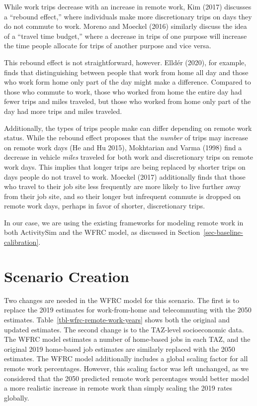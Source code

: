 \documentclass[fancy, twoside, mastersfancy, ms]{byuthesis}
\begin{document}
While work trips decrease with an increase in remote work, Kim (2017)
discusses a ``rebound effect,'' where individuals make more
discretionary trips on days they do not commute to work. Moreno and
Moeckel (2016) similarly discuss the idea of a ``travel time budget,''
where a decrease in trips of one purpose will increase the time people
allocate for trips of another purpose and vice versa.

This rebound effect is not straightforward, however. Elldér (2020), for
example, finds that distinguishing between people that work from home
all day and those who work form home only part of the day might make a
difference. Compared to those who commute to work, those who worked from
home the entire day had fewer trips and miles traveled, but those who
worked from home only part of the day had more trips and miles traveled.

Additionally, the types of trips people make can differ depending on
remote work status. While the rebound effect proposes that the
\emph{number} of trips may increase on remote work days (He and Hu
2015), Mokhtarian and Varma (1998) find a decrease in vehicle
\emph{miles} traveled for both work and discretionary trips on remote
work days. This implies that longer trips are being replaced by shorter
trips on days people do not travel to work. Moeckel (2017) additionally
finds that those who travel to their job site less frequently are more
likely to live further away from their job site, and so their longer but
infrequent commute is dropped on remote work days, perhaps in favor of
shorter, discretionary trips.

In our case, we are using the existing frameworks for modeling remote
work in both ActivitySim and the WFRC model, as discussed in
Section~\ref{sec-baseline-calibration}.

\section{Scenario Creation}\label{scenario-creation-2}

Two changes are needed in the WFRC model for this scenario. The first is
to replace the 2019 estimates for work-from-home and telecommuting with
the 2050 estimates. Table~\ref{tbl-wfrc-remote-work-years} shows both
the original and updated estimates. The second change is to the
TAZ-level socioeconomic data. The WFRC model estimates a number of
home-based jobs in each TAZ, and the original 2019 home-based job
estimates are similarly replaced with the 2050 estimates. The WFRC model
additionally includes a global scaling factor for all remote work
percentages. However, this scaling factor was left unchanged, as we
considered that the 2050 predicted remote work percentages would better
model a more realistic increase in remote work than simply scaling the
2019 rates globally.
\end{document}
